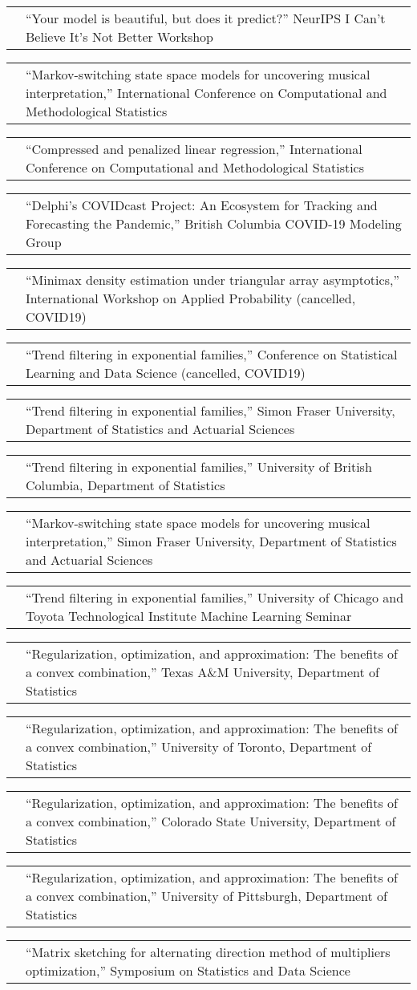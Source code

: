 \documentclass[11pt,letterpaper]{minimal/moderncv}
\makeatletter
\renewcommand*{\cvitem}[2]{%
  \begin{tabular}{@{}p{\hintscolumnwidth}@{\hspace{\separatorcolumnwidth}}%
    p{\maincolumnwidth}@{}}%
    \raggedleft {#1} &  {#2}%
  \end{tabular}%
}
\makeatother
\begin{document}
\cvitem{2021}{``Your model is beautiful, but does it predict?'' NeurIPS
  I Can't Believe It's Not Better Workshop}
\cvitem{}{``Markov-switching state space models for uncovering musical
  interpretation,'' International Conference on Computational and
  Methodological Statistics}

\cvitem{2020}{``Compressed and penalized linear regression,''
  International Conference on Computational and Methodological Statistics}

\cvitem{}{``Delphi's COVIDcast Project: 
  An Ecosystem for Tracking and Forecasting the Pandemic,'' British Columbia
  COVID-19 Modeling Group}

\cvitem{}{``Minimax density estimation under triangular array asymptotics,''
  International Workshop on Applied Probability (cancelled, COVID19)} 

\cvitem{}{``Trend filtering in exponential families,'' Conference
    on Statistical Learning and Data Science (cancelled, COVID19)}

\cvitem{}{``Trend filtering in exponential families,'' Simon
  Fraser University, Department of Statistics and Actuarial Sciences}


\cvitem{}{``Trend filtering in exponential families,'' University
  of British Columbia, Department of Statistics}

\cvitem{2019}{``Markov-switching state space models for uncovering
  musical interpretation,'' Simon Fraser University, Department of
  Statistics and Actuarial Sciences}

\cvitem{}{ ``Trend filtering in exponential families,'' University of
  Chicago and Toyota Technological Institute Machine Learning
  Seminar}

\cvitem{}{ ``Regularization, optimization, and approximation: The benefits
  of a convex combination,'' Texas A\&M University, Department of
  Statistics }

\cvitem{}{ ``Regularization, optimization, and approximation: The benefits
  of a convex combination,'' University of Toronto, Department of
  Statistics }

\cvitem{}{ ``Regularization, optimization, and approximation: The benefits
  of a convex combination,'' Colorado State University, Department of
  Statistics }

\cvitem{}{ ``Regularization, optimization, and approximation: The benefits
  of a convex combination,'' University of Pittsburgh, Department of
  Statistics }

\cvitem{2018}{ ``Matrix sketching for alternating direction method of
  multipliers optimization,'' Symposium on Statistics and Data
  Science}
\end{document}
